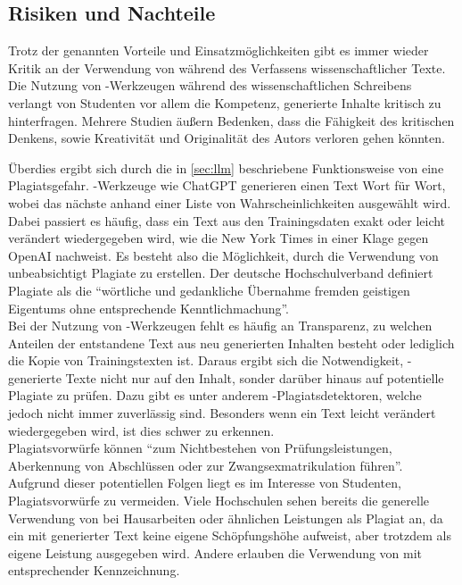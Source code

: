 \documentclass[../main.tex]{subfiles}
\begin{document}
\subsection{Risiken und Nachteile}
\label{sec:nachteile}

Trotz der genannten Vorteile und Einsatzmöglichkeiten gibt es immer wieder Kritik an der Verwendung von  während des Verfassens wissenschaftlicher Texte. 
Die Nutzung von -Werkzeugen während des wissenschaftlichen Schreibens verlangt von Studenten vor allem die Kompetenz, generierte Inhalte kritisch zu 
hinterfragen. Mehrere Studien äußern Bedenken, dass die Fähigkeit des kritischen Denkens, sowie Kreativität und Originalität des Autors verloren gehen könnten.\cite{ZukunftWissenschaftlichesPublizieren,teachers,BucherSchwarzerHolzwweißig}

Überdies ergibt sich durch die in \autoref{sec:llm} beschriebene Funktionsweise von  eine Plagiatsgefahr. -Werkzeuge wie ChatGPT generieren einen Text Wort für Wort, wobei das nächste anhand 
einer Liste von Wahrscheinlichkeiten ausgewählt wird. Dabei passiert es häufig, dass ein Text aus den Trainingsdaten exakt oder leicht verändert wiedergegeben wird, wie die New York Times in 
einer Klage gegen OpenAI nachweist\cite{NYTimes}. Es besteht also die Möglichkeit, durch die Verwendung von  unbeabsichtigt Plagiate zu erstellen. Der deutsche Hochschulverband definiert Plagiate als 
die "`wörtliche und gedankliche Übernahme fremden geistigen Eigentums ohne entsprechende Kenntlichmachung"'\cite{Hochschulverband}. \\ Bei der Nutzung von -Werkzeugen fehlt es häufig an Transparenz, 
zu welchen Anteilen der entstandene Text aus neu generierten Inhalten besteht oder lediglich die Kopie von Trainingstexten ist. Daraus ergibt sich die Notwendigkeit, -generierte Texte nicht nur 
auf den Inhalt, sonder darüber hinaus auf potentielle Plagiate zu prüfen. Dazu gibt es unter anderem -Plagiatsdetektoren, welche jedoch nicht immer zuverlässig sind. Besonders wenn ein Text 
leicht verändert wiedergegeben wird, ist dies schwer zu erkennen.\\ Plagiatsvorwürfe können "`zum Nichtbestehen von Prüfungsleistungen, Aberkennung von Abschlüssen  oder  zur  Zwangsexmatrikulation  
führen"'\cite{Plagiate}. Aufgrund dieser potentiellen Folgen liegt es im Interesse von Studenten, Plagiatsvorwürfe zu vermeiden. Viele Hochschulen sehen bereits die generelle Verwendung von  bei Hausarbeiten 
oder ähnlichen Leistungen als Plagiat an, da ein mit  generierter Text keine eigene Schöpfungshöhe aufweist, aber trotzdem als eigene Leistung ausgegeben wird. Andere erlauben die Verwendung von 
 mit entsprechender Kennzeichnung.\cite{Plagiate}
\end{document}
